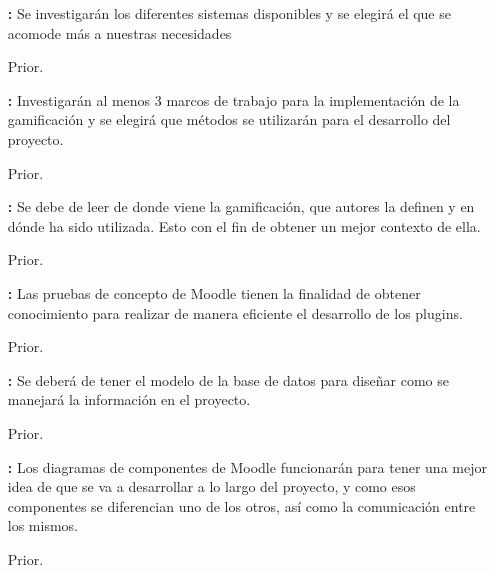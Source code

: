 \begin{multicols}{2}
\begin{itemize}
    	\item[\bf \ida] {\bf \desc:} Se investigarán los diferentes sistemas disponibles y se elegirá el que se acomode más a nuestras necesidades
        \item[Prior.] \Valor
\end{itemize}

\begin{itemize}
    	\item[\bf \ida] {\bf \desc:} Investigarán al menos 3 marcos de trabajo para la implementación de la gamificación y se elegirá que métodos se utilizarán para el desarrollo del proyecto.
        \item[Prior.] \Valor
\end{itemize}

\begin{itemize}
    	\item[\bf \ida] {\bf \desc:} Se debe de leer de donde viene la gamificación, que autores la definen y en dónde ha sido utilizada. Esto con el fin de obtener un mejor contexto de ella.
        \item[Prior.] \Valor
\end{itemize}

\begin{itemize}
    	\item[\bf \ida] {\bf \desc:} Las pruebas de concepto de Moodle tienen la finalidad de obtener conocimiento para realizar de manera eficiente el desarrollo de los plugins.
        \item[Prior.] \Valor
\end{itemize}

\begin{itemize}
    	\item[\bf \ida] {\bf \desc:} Se deberá de tener el modelo de la base de datos para diseñar como se manejará la información en el proyecto.
        \item[Prior.] \Valor
\end{itemize}

\begin{itemize}
    	\item[\bf \ida] {\bf \desc:} Los diagramas de componentes de Moodle funcionarán para tener una mejor idea de que se va a desarrollar a lo largo del proyecto, y como esos componentes se diferencian uno de los otros, así como la comunicación entre los mismos.
        \item[Prior.] \Valor
\end{itemize}


\end{multicols}
